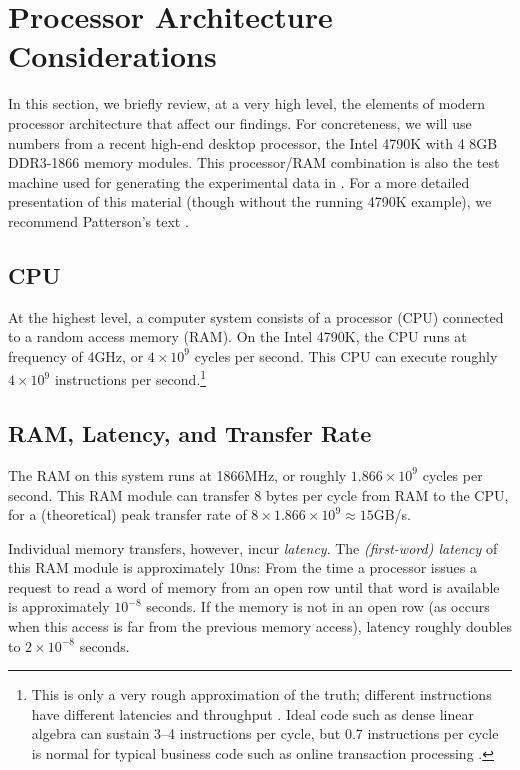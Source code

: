 \documentclass{patmorin}
\begin{document}
\section{Processor Architecture Considerations}

In this section, we briefly review, at a very high level, the
elements of modern processor architecture that affect our findings.
For concreteness, we will use numbers from a recent high-end desktop
processor, the Intel 4790K \cite{intel:4790k} with 4 8GB DDR3-1866 memory
modules.  This processor/RAM combination is also the test machine used
for generating the experimental data in .  For a more
detailed presentation of this material (though without the running 4790K
example), we recommend Patterson's text \cite{patterson:modern}.


\subsection{CPU}

At the highest level, a computer system consists of a processor (CPU)
connected to a random access memory (RAM). On the Intel 4790K, the
CPU runs at frequency of 4GHz, or $4\times10^9$ cycles per second.
This CPU can execute roughly $4\times 10^{9}$ instructions per
second.\footnote{This is only a very rough approximation of the
truth; different instructions have different latencies and throughput
\cite{fog:instruction}.  Ideal code such as dense linear algebra can
sustain 3--4 instructions per cycle, but 0.7 instructions per cycle is
normal for typical business code such as online transaction processing
\cite{tozun.pandis.ea:from}.}



\subsection{RAM, Latency, and Transfer Rate}

The RAM on this system runs at 1866MHz, or roughly $1.866\times10^9$
cycles per second.  This RAM module can transfer 8 bytes per cycle
from RAM to the CPU, for a (theoretical) peak transfer rate of $8\times
1.866\times10^9\approx 15$GB/s.

Individual memory transfers, however, incur \emph{latency}.
The \emph{(first-word) latency} of this RAM module is approximately
10ns: From the time a processor issues a request to read a word of
memory from an open row until that word is available is approximately
$10^{-8}$ seconds.  If the memory is not in an open row (as occurs when
this access is far from the previous memory access), latency roughly
doubles to $2\times 10^{-8}$ seconds.
\end{document}
